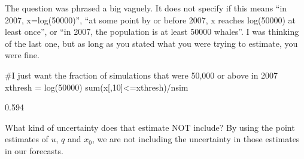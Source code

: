 \begin{wideitemize}
\smallskip
The question was phrased a big vaguely.  It does not specify if this means ``in 2007, x=log(50000)'', ``at some point by or before 2007, x reaches log(50000) at least once'', or ``in 2007, the population is at least 50000 whales''.  I was thinking of the last one, but as long as you stated what you were trying to estimate, you were fine.
\begin{Schunk}
\begin{Sinput}
 #I just want the fraction of simulations that were 50,000 or above in 2007
 xthresh = log(50000)
 sum(x[,10]<=xthresh)/nsim
\end{Sinput}
\begin{Soutput}
[1] 0.594
\end{Soutput}
\end{Schunk}
\item What kind of uncertainty does that estimate NOT include?
\smallskip
By using the point estimates of $u$, $q$ and $x_0$, we are not including the uncertainty in those estimates in our forecasts.
\end{wideitemize}

